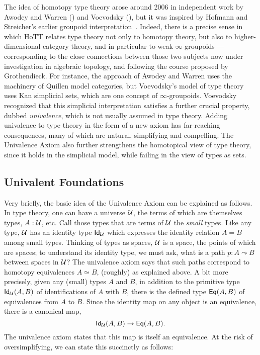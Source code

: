 {The idea of homotopy type theory arose around 2006 in independent work by Awodey and Warren (\cite{AW}) and Voevodsky (\cite{VV}), but it was inspired by 
Hofmann and Streicher's earlier groupoid interpretation~\cite{HofmannM:gromtt}.  Indeed, there is a precise sense in which HoTT relates type theory not only to homotopy theory, but also to higher-dimensional category theory, and in particular to weak $\infty$-groupoids --- corresponding to the close connections between those two subjects now under investigation in algebraic topology, and following the course proposed by Grothendieck.  For instance, the approach of Awodey and Warren uses the machinery of Quillen model categories, but Voevodsky's model of type theory uses Kan simplicial sets, which are one concept of $\infty$-groupoids.  Voevodsky recognized that this simplicial interpretation satisfies a further crucial property, dubbed \emph{univalence},  which is not usually assumed in type theory.  Adding univalence  to type theory in the form of a new axiom has far-reaching consequences, many of which are natural, simplifying and compelling.  The Univalence Axiom also further strengthens the homotopical view of type theory, since it holds in the simplicial model, while failing in the view of types as sets.  

\subsection*{Univalent Foundations}

Very briefly, the basic idea of the Univalence Axiom can be explained as follows.  In type theory, one can have a universe ${\mathcal U}$, the terms of which are themselves types, $A : {\mathcal U}$, etc.  Call those types that are terms of ${\mathcal U}$ the \emph{small} types.  Like any type, ${\mathcal U}$ has an identity type ${{\sf Id}}_{{\mathcal U}}$ which expresses the identity relation $A = B$ among small types.  Thinking of types as spaces, ${\mathcal U}$ is a space, the points of which are spaces; to understand its identity type, we must ask, what is a path $p : A \leadsto B$ between spaces in ${\mathcal U}$?  The univalence axiom says that such paths correspond to homotopy equivalences $A\simeq B$, (roughly) as explained above.  A bit more precisely, given any (small) types $A$ and $B$, in addition to the primitive type ${{\sf Id}}_{{\mathcal U}}(A,B)$ of identifications of $A$ with $B$, there is the defined type ${{\sf Eq}}(A,B)$ of equivalences from $A$ to $B$.  Since the identity map on any object is an equivalence, there is a canonical map,
$${{\sf Id}}_{{\mathcal U}}(A,B)\to{{\sf Eq}}(A,B).$$
The univalence axiom states that this map is itself an equivalence.  At the risk of oversimplifying, we can state this succinctly as follows:

}
